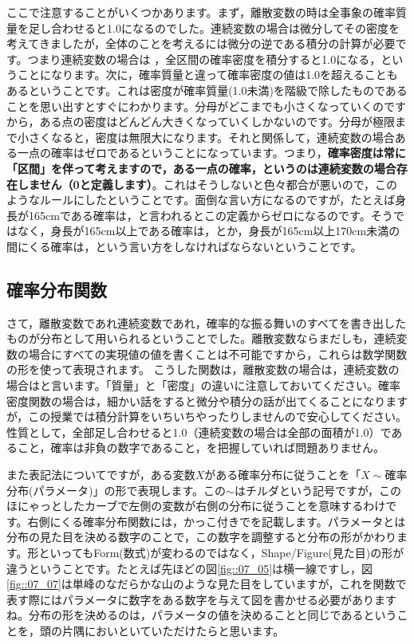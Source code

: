 \documentclass{ltjbook}
\begin{document}
ここで注意することがいくつかあります。まず，離散変数の時は全事象の確率質量を足し合わせると1.0になるのでした。連続変数の場合は微分してその密度を考えてきましたが，全体のことを考えるには微分の逆である積分の計算が必要です。つまり連続変数の場合は
，全区間の確率密度を積分すると1.0になる，ということになります。次に，確率質量と違って確率密度の値は1.0を超えることもあるということです。これは密度が確率質量(1.0未満)を階級で除したものであることを思い出すとすぐにわかります。分母がどこまでも小さくなっていくのですから，ある点の密度はどんどん大きくなっていくしかないのです。分母が極限まで小さくなると，密度は無限大になります。それと関係して，連続変数の場合ある一点の確率はゼロであるということになっています。つまり，\textbf{確率密度は常に「区間」を伴って考えますので，ある一点の確率，というのは連続変数の場合存在しません（0と定義します）}。これはそうしないと色々都合が悪いので，このようなルールにしたということです。面倒な言い方になるのですが，たとえば身長が165cmである確率は，と言われるとこの定義からゼロになるのです。そうではなく，身長が165cm以上である確率は，とか，身長が165cm以上170cm未満の間にくる確率は，という言い方をしなければならないということです。

\subsection{確率分布関数}
さて，離散変数であれ連続変数であれ，確率的な振る舞いのすべてを書き出したものが分布として用いられるということでした。離散変数ならまだしも，連続変数の場合にすべての実現値の値を書くことは不可能ですから，これらは数学関数の形を使って表現されます。
こうした関数は，離散変数の場合は，連続変数の場合はと言います。「質量」と「密度」の違いに注意しておいてください。確率密度関数の場合は，細かい話をすると微分や積分の話が出てくることになりますが，この授業では積分計算をいちいちやったりしませんので安心してください。性質として，全部足し合わせると1.0（連続変数の場合は全部の面積が1.0）であること，確率は非負の数字であること，を把握していれば問題ありません。

また表記法についてですが，ある変数$X$がある確率分布に従うことを「$X\sim$確率分布(パラメータ)」の形で表現します。この$\sim$はチルダという記号ですが，このほにゃっとしたカーブで左側の変数が右側の分布に従うことを意味するわけです。右側にくる確率分布関数には，かっこ付きでを記載します。パラメータとは分布の見た目を決める数字のことで，この数字を調整すると分布の形がかわります。形といってもForm(数式)が変わるのではなく，Shape/Figure(見た目)の形が違うということです。たとえば先ほどの図\ref{fig::07_05}は横一線ですし，図\ref{fig::07_07}は単峰のなだらかな山のような見た目をしていますが，これを関数で表す際にはパラメータに数字をある数字を与えて図を書かせる必要がありますね。分布の形を決めるのは，パラメータの値を決めることと同じであるということを，頭の片隅においといていただけたらと思います。
\end{document}
